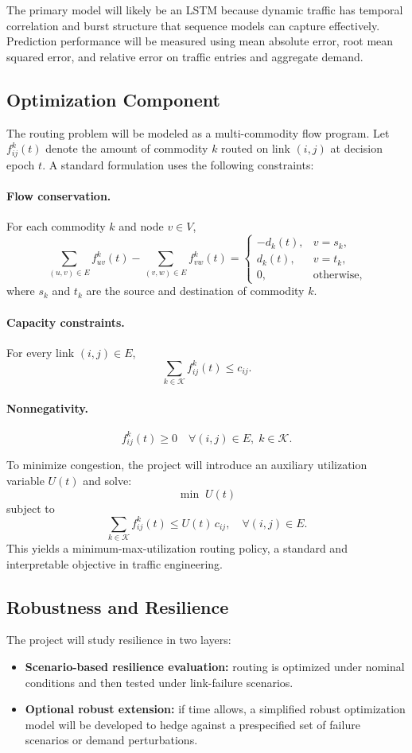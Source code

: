 \documentclass[11pt]{article}
\begin{document}
The primary model will likely be an LSTM because dynamic traffic has temporal correlation and burst structure that sequence models can capture effectively. Prediction performance will be measured using mean absolute error, root mean squared error, and relative error on traffic entries and aggregate demand.

\subsection{Optimization Component}
The routing problem will be modeled as a multi-commodity flow program. Let $f_{ij}^{k}(t)$ denote the amount of commodity $k$ routed on link $(i,j)$ at decision epoch $t$. A standard formulation uses the following constraints:

\paragraph{Flow conservation.}
For each commodity $k$ and node $v \in V$,
\[
\sum_{(u,v)\in E} f_{uv}^{k}(t) - \sum_{(v,w)\in E} f_{vw}^{k}(t) =
\begin{cases}
-d_k(t), & v = s_k, \\
d_k(t), & v = t_k, \\
0, & \text{otherwise,}
\end{cases}
\]
where $s_k$ and $t_k$ are the source and destination of commodity $k$.

\paragraph{Capacity constraints.}
For every link $(i,j)\in E$,
\[
\sum_{k\in\mathcal{K}} f_{ij}^{k}(t) \le c_{ij}.
\]

\paragraph{Nonnegativity.}
\[
f_{ij}^{k}(t) \ge 0 \quad \forall (i,j)\in E, \; k\in\mathcal{K}.
\]

To minimize congestion, the project will introduce an auxiliary utilization variable $U(t)$ and solve:
\[
\min \; U(t)
\]
subject to
\[
\sum_{k\in\mathcal{K}} f_{ij}^{k}(t) \le U(t) \, c_{ij}, \quad \forall (i,j)\in E.
\]
This yields a minimum-max-utilization routing policy, a standard and interpretable objective in traffic engineering.

\subsection{Robustness and Resilience}
The project will study resilience in two layers:
\begin{itemize}
    \item \textbf{Scenario-based resilience evaluation:} routing is optimized under nominal conditions and then tested under link-failure scenarios.
    \item \textbf{Optional robust extension:} if time allows, a simplified robust optimization model will be developed to hedge against a prespecified set of failure scenarios or demand perturbations.
\end{itemize}
\end{document}
